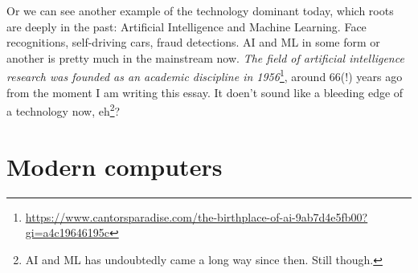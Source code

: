 \documentclass{report}
\begin{document}
            Or we can see another example of the technology dominant today, which roots are deeply in the past: Artificial Intelligence and Machine Learning. Face recognitions, self-driving cars, fraud detections.
            AI and ML in some form or another is pretty much in the mainstream now. \emph{The field of artificial intelligence research was founded as an academic discipline in 1956}\footnote{
            \href{https://www.cantorsparadise.com/the-birthplace-of-ai-9ab7d4e5fb00?gi=a4c19646195c}{https://www.cantorsparadise.com/the-birthplace-of-ai-9ab7d4e5fb00?gi=a4c19646195c}}, around 66(!) years ago 
            from the moment I am writing this essay. It doen't sound like a bleeding edge of a technology now, eh\footnote{AI and ML has undoubtedly came a long way since then. Still though.}? \par

            \newpage
        \section{Modern computers}
            \newpage

    
\end{document}
